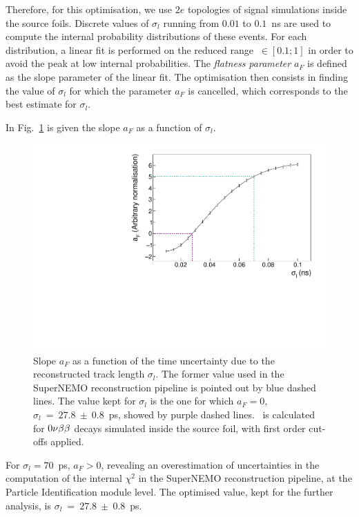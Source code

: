 Therefore, for this optimisation, we use $2e$ topologies of signal simulations inside the source foils.
Discrete values of $\sigma_{l}$ running from $0.01$ to $0.1$~ns are used to compute the internal probability distributions of these events.
For each distribution, a linear fit is performed on the reduced range \Pint$~\in[0.1;1]$ in order to avoid the peak at low internal probabilities.
The \emph{flatness parameter} $a_{F}$ is defined as the slope parameter of the linear fit.
The optimisation then consists in finding the value of $\sigma_{l}$ for which the parameter $a_{F}$ is cancelled, which corresponds to the best estimate for $\sigma_{l}$.

In Fig.~\ref{fig:flatness} is given the slope $a_{F}$ as a function of $\sigma_{l}$.
\begin{figure}[!h]
  \centering
  \includegraphics[width=13cm]{timedifference/fig_timediff/flatness.pdf}
  \caption{Slope $a_{F}$ as a function of the time uncertainty due to the reconstructed track length $\sigma_{l}$.
    The former value used in the SuperNEMO reconstruction pipeline is pointed out by blue dashed lines.
    The value kept for $\sigma_{l}$ is the one for which $a_{F}=0$, $\sigma_{l}~=~27.8~\pm~0.8$~ps, showed by purple dashed lines.
    \Pint\ is calculated for $0\nu\beta\beta$ decays simulated inside the source foil, with first order cut-offs applied.
    \label{fig:flatness}}
\end{figure}
For $\sigma_{l}=70$~ps, $a_{F}>0$, revealing an overestimation of uncertainties in the computation of the internal $\chi^{2}$ in the SuperNEMO reconstruction pipeline, at the Particle Identification module level.
The optimised value, kept for the further analysis, is $\sigma_{l}~=~27.8~\pm~0.8$~ps.
